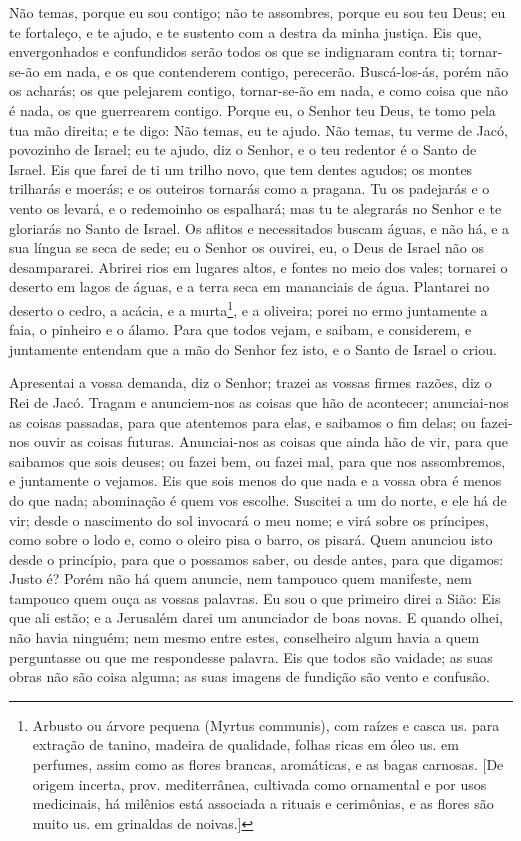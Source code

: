 Não temas, porque eu sou contigo; não te assombres, porque eu sou
teu Deus; eu te fortaleço, e te ajudo, e te sustento com a destra da
minha justiça. Eis que, envergonhados e confundidos serão
todos os que se indignaram contra ti; tornar-se-ão em nada, e os que
contenderem contigo, perecerão. Buscá-los-ás, porém não os
acharás; os que pelejarem contigo, tornar-se-ão em nada, e como
coisa que não é nada, os que guerrearem contigo. Porque eu, o
Senhor teu Deus, te tomo pela tua mão direita; e te digo: Não temas,
eu te ajudo. Não temas, tu verme de Jacó, povozinho de
Israel; eu te ajudo, diz o Senhor, e o teu redentor é o Santo de
Israel. Eis que farei de ti um trilho novo, que tem dentes
agudos; os montes trilharás e moerás; e os outeiros tornarás como a
pragana. Tu os padejarás e o vento os levará, e o redemoinho
os espalhará; mas tu te alegrarás no Senhor e te gloriarás no Santo
de Israel. Os aflitos e necessitados buscam águas, e não há,
e a sua língua se seca de sede; eu o Senhor os ouvirei, eu, o Deus
de Israel não os desampararei. Abrirei rios em lugares altos,
e fontes no meio dos vales; tornarei o deserto em lagos de águas, e
a terra seca em mananciais de água. Plantarei no deserto o
cedro, a acácia, e a murta\footnote{Arbusto ou árvore pequena
(Myrtus communis), com raízes e casca us. para extração de tanino,
madeira de qualidade, folhas ricas em óleo us. em perfumes, assim
como as flores brancas, aromáticas, e as bagas carnosas. [De origem
incerta, prov. mediterrânea, cultivada como ornamental e por usos
medicinais, há milênios está associada a rituais e cerimônias, e as
flores são muito us. em grinaldas de noivas.]}, e a oliveira; porei
no ermo juntamente a faia, o pinheiro e o álamo. Para que
todos vejam, e saibam, e considerem, e juntamente entendam que a mão
do Senhor fez isto, e o Santo de Israel o criou.

Apresentai a vossa demanda, diz o Senhor; trazei as vossas firmes
razões, diz o Rei de Jacó. Tragam e anunciem-nos as coisas
que hão de acontecer; anunciai-nos as coisas passadas, para que
atentemos para elas, e saibamos o fim delas; ou fazei-nos ouvir as
coisas futuras. Anunciai-nos as coisas que ainda hão de vir,
para que saibamos que sois deuses; ou fazei bem, ou fazei mal, para
que nos assombremos, e juntamente o vejamos. Eis que sois
menos do que nada e a vossa obra é menos do que nada; abominação é
quem vos escolhe. Suscitei a um do norte, e ele há de vir;
desde o nascimento do sol invocará o meu nome; e virá sobre os
príncipes, como sobre o lodo e, como o oleiro pisa o barro, os
pisará. Quem anunciou isto desde o princípio, para que o
possamos saber, ou desde antes, para que digamos: Justo é? Porém não
há quem anuncie, nem tampouco quem manifeste, nem tampouco quem ouça
as vossas palavras. Eu sou o que primeiro direi a Sião: Eis
que ali estão; e a Jerusalém darei um anunciador de boas novas.
E quando olhei, não havia ninguém; nem mesmo entre estes,
conselheiro algum havia a quem perguntasse ou que me respondesse
palavra. Eis que todos são vaidade; as suas obras não são
coisa alguma; as suas imagens de fundição são vento e confusão.

